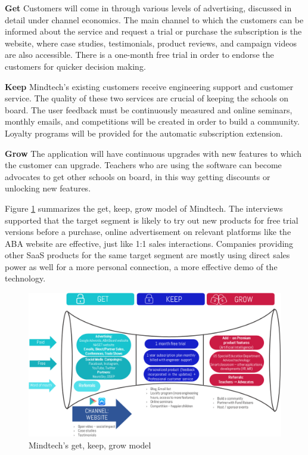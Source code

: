 \documentclass[letterpaper,10pt]{article}
\begin{document}
\textbf{Get} Customers will come in through various levels of advertising, discussed in detail under channel economics. The main channel to which the customers can be informed about the service and request a trial or purchase the subscription is the website, where case studies, testimonials, product reviews, and campaign videos are also accessible. There is a one-month free trial in order to endorse the customers for quicker decision making. 

\textbf{Keep} Mindtech’s existing customers receive engineering support and customer service. The quality of these two services are crucial of keeping the schools on board. The user feedback must be continuously measured and online seminars, monthly emails, and competitions will be created in order to build a community. Loyalty programs will be provided for the automatic subscription extension.

\textbf{Grow} The application will have continuous upgrades with new features to which the customer can upgrade. Teachers who are using the software can become advocates to get other schools on board, in this way getting discounts or unlocking new features. 

Figure \ref{img:gkg} summarizes the get, keep, grow model of Mindtech. The interviews supported that the target segment is likely to try out new products for free trial versions before a purchase, online advertisement on relevant platforms like the ABA website are effective, just like 1:1 sales interactions. Companies providing other SaaS products for the same target segment are mostly using direct sales power as well for a more personal connection, a more effective demo of the technology.


\begin{figure}[!htb]
\centering
\includegraphics[scale=0.5]{gkg.PNG}
\caption{Mindtech's get, keep, grow model}
\label{img:gkg}
\end{figure}
\end{document}
